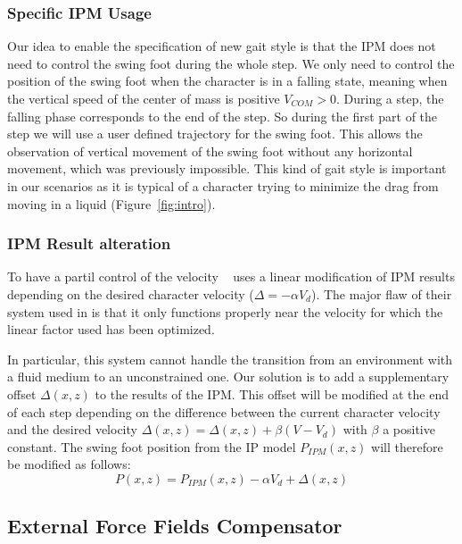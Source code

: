 \documentclass[conference]{acmsiggraph}
\begin{document}
\subsubsection{Specific IPM Usage}
\label{sec:specific_ipm}

Our idea to enable the specification of new gait style is that the IPM does not need to control the swing foot during the whole step. We only need to control the position of the swing foot when the character is in a falling state, meaning when the vertical speed of the center of mass is positive $V_{COM}>0$. During a step, the falling phase corresponds to the end of the step. So during the first part of the step we will use a user defined trajectory for the swing foot. This allows the observation of vertical movement of the swing foot without any horizontal movement, which was previously impossible. This kind of gait style is important in our scenarios as it is typical of a character trying to minimize the drag from moving in a liquid (Figure~\ref{fig:intro}).

\subsubsection{IPM Result alteration}
\label{sec:ipm_alt}

To have a partil control of the velocity ~\cite{coros2010generalized} uses a linear modification of IPM results depending on the desired character velocity ($\Delta=-\alpha V_d$). The major flaw of their system used in is that it only functions properly near the velocity for which the linear factor used has been optimized. 

In particular, this system cannot handle the transition from an environment with a fluid medium to an unconstrained one. Our solution is to add a supplementary offset $\Delta(x,z)$ to the results of the IPM. This offset will be modified at the end of each step depending on the difference between the current character velocity and the desired velocity $\Delta(x,z) = \Delta(x,z)+\beta(V-V_d)$ with $\beta$ a positive constant. The swing foot position from the IP model $P_{IPM}(x,z)$ will therefore be modified as follows:
$$
P(x,z) = P_{IPM}(x,z) - \alpha V_d + \Delta(x,z)
$$ 

\subsection{External Force Fields Compensator}
\label{sec:ext_force_comp}
\end{document}
